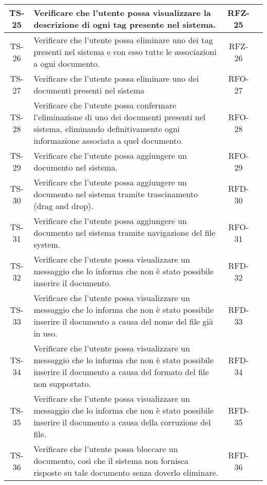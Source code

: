 \begin{xltabular}{\textwidth}{| c | X | c | c |}
    \hline
    TS-25 & Verificare che l’utente possa visualizzare la descrizione di ogni tag presente nel sistema. & RFZ-25 & \textcolor{xmarkcolor}{} \\
    \hline
    TS-26 & Verificare che l’utente possa eliminare uno dei tag presenti nel sistema e con esso tutte le associazioni a ogni documento. & RFZ-26 & \textcolor{xmarkcolor}{} \\
    \hline
    TS-27 & Verificare che l’utente possa eliminare uno dei documenti presenti nel sistema & RFO-27 & \textcolor{xmarkcolor}{} \\
    \hline
    TS-28 & Verificare che l’utente possa confermare l’eliminazione di uno dei documenti presenti nel sistema, eliminando definitivamente  ogni informazione associata a quel documento. & RFO-28 & \textcolor{xmarkcolor}{} \\
    \hline
    TS-29 & Verificare che l’utente possa aggiungere un documento nel sistema. & RFO-29 & \textcolor{xmarkcolor}{} \\
    \hline
    TS-30 & Verificare che l’utente possa aggiungere un documento nel sistema tramite trascinamento (drag and drop). & RFD-30 & \textcolor{xmarkcolor}{} \\
    \hline
    TS-31 & Verificare che l’utente possa aggiungere un documento nel sistema tramite navigazione del file system. & RFO-31 & \textcolor{xmarkcolor}{} \\
    \hline
    TS-32 & Verificare che l'utente possa visualizzare un messaggio che lo informa che non è stato possibile inserire il documento. & RFD-32 & \textcolor{xmarkcolor}{} \\
    \hline
    TS-33 & Verificare che l'utente possa visualizzare un messaggio che lo informa che non è stato possibile inserire il documento a causa del nome del file già in uso. & RFD-33 & \textcolor{xmarkcolor}{} \\
    \hline
    TS-34 & Verificare che l’utente possa visualizzare un messaggio che lo informa che non è stato possibile inserire il documento a causa del formato del file non supportato. & RFD-34 & \textcolor{xmarkcolor}{} \\
    \hline
    TS-35 & Verificare che l’utente possa visualizzare un messaggio che lo informa che non è stato possibile inserire il documento a causa della corruzione del file. & RFD-35 & \textcolor{xmarkcolor}{} \\
    \hline
    TS-36 & Verificare che l'utente possa bloccare un documento, così che il sistema non fornisca risposte su tale documento senza doverlo eliminare. & RFD-36 & \textcolor{xmarkcolor}{} \\

\end{xltabular}

